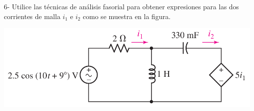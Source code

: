 \documentclass[10pt,letterpaper]{article}
\begin{document}
6- Utilice las técnicas de análisis fasorial para obtener expresiones para las dos corrientes de malla $i_1$ e $i_2$ como se muestra en la figura.

\includegraphics[scale=0.4]{c6}

%
%
%
%
%
%
\end{document}
